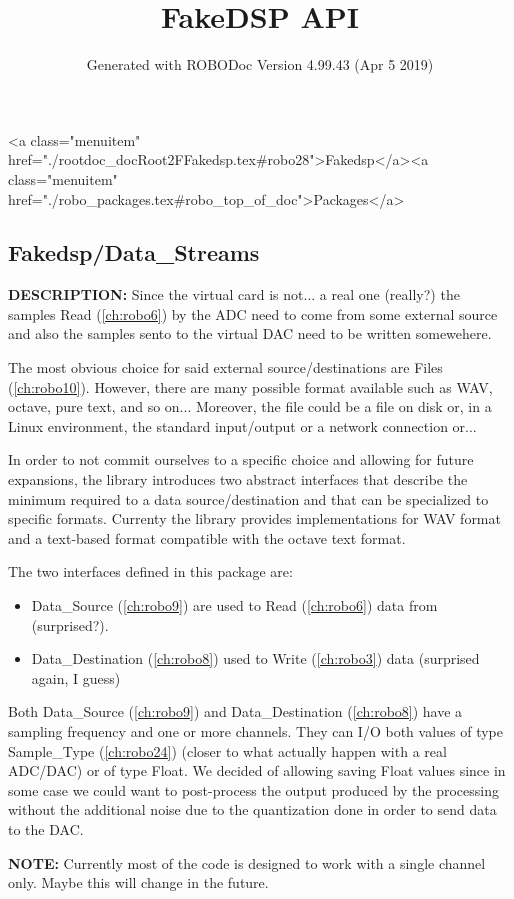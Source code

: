 \documentclass{article}
\title{FakeDSP API}
\author{Generated with ROBODoc Version 4.99.43 (Apr  5 2019)
}
\begin{document}
\maketitle
\printindex
\tableofcontents
\newpage

<a class="menuitem" href="./rootdoc_docRoot2FFakedsp.tex#robo28">Fakedsp</a><a class="menuitem" href="./robo_packages.tex#robo_top_of_doc">Packages</a>\subsection{Fakedsp/Data\_Streams}
\textbf{DESCRIPTION:}\hspace{0.08in}
   Since the virtual card is not... a real one (really?) the samples
   Read (\ref{ch:robo6}) by the ADC need to come from some external source and also
   the samples sento to the virtual DAC need to be written somewehere.



   The most obvious choice for said external source/destinations are
   Files (\ref{ch:robo10}).  However, there are many possible format available such as
   WAV, octave, pure text, and so on...  Moreover, the file could be a
   file on disk or, in a Linux environment, the standard input/output or
   a network connection or...



   In order to not commit ourselves to a specific choice and allowing
   for future expansions, the library introduces two abstract
   interfaces that describe the minimum required to a data source/destination
   and that can be specialized to specific formats. Currenty the library
   provides implementations for WAV format and a text-based format
   compatible with the octave text format.



   The two interfaces defined in this package are:

\begin{itemize}
  \item    Data\_Source (\ref{ch:robo9}) are used to Read (\ref{ch:robo6}) data from (surprised?).
  \item    Data\_Destination (\ref{ch:robo8}) used to Write (\ref{ch:robo3}) data (surprised again, I guess)
\end{itemize}


   Both Data\_Source (\ref{ch:robo9}) and Data\_Destination (\ref{ch:robo8}) have a sampling frequency
   and one or more channels.  They can I/O both values of type
   Sample\_Type (\ref{ch:robo24}) (closer to what actually happen with a real ADC/DAC)
   or of type Float.  We decided of allowing saving Float values
   since in some case we could want to post-process the output produced
   by the processing without the additional noise due to the quantization
   done in order to send data to the DAC.

\textbf{NOTE:}\hspace{0.08in}
   Currently most of the code is designed to work with a single channel
   only.  Maybe this will change in the future.
\end{document}
